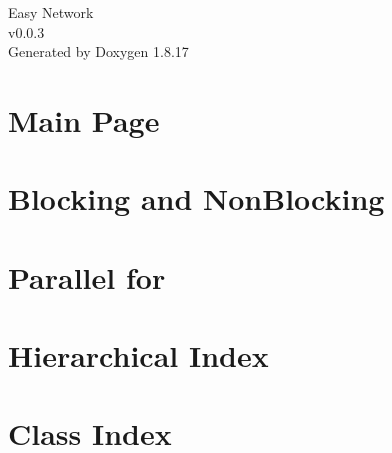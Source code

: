 \let\mypdfximage\pdfximage\def\pdfximage{\immediate\mypdfximage}\documentclass[twoside]{book}
\newcommand{\+}{\discretionary{\mbox{\scriptsize$\hookleftarrow$}}{}{}}
\newcommand{\clearemptydoublepage}{%
  \newpage{\pagestyle{empty}\cleardoublepage}%
}
\begin{document}
\hypersetup{pageanchor=false,
             bookmarksnumbered=true,
             pdfencoding=unicode
            }
\begin{titlepage}
\vspace*{7cm}
\begin{center}%
{\Large Easy Network \\[1ex]\large v0.\+0.\+3 }\\
\vspace*{1cm}
{\large Generated by Doxygen 1.8.17}\\
\end{center}
\end{titlepage}
\clearemptydoublepage
{}
\tableofcontents
\clearemptydoublepage
{}
\hypersetup{pageanchor=true}

\chapter{Main Page}
\label{index}\hypertarget{index}{}
\chapter{Blocking and Non\+Blocking}
\label{md__e_n__blocking_and_non_blocking}

\chapter{Parallel for}
\label{md__e_n__parallel_for}

\chapter{Hierarchical Index}

\chapter{Class Index}

\end{document}
